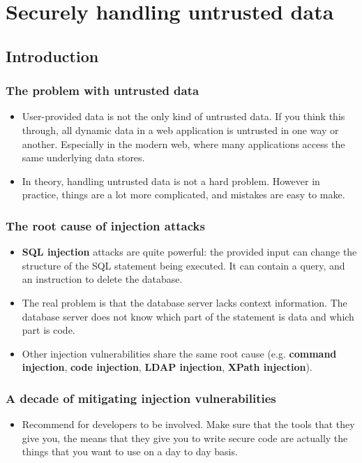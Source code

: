 \documentclass[../main.tex]{subfiles}
\begin{document}
\chapter{Securely handling untrusted data}

\section{Introduction}
\subsection{The problem with untrusted data}
\begin{itemize}
\item User-provided data is not the only kind of untrusted data. If you think this through, all dynamic data in a web application is untrusted in one way or another. Especially in the modern web, where many applications access the same underlying data stores.
\item In theory, handling untrusted data is not a hard problem. However in practice, things are a lot more complicated, and mistakes are easy to make.
\end{itemize}

\subsection{The root cause of injection attacks}
\begin{itemize}
\item \textbf{SQL injection} attacks are quite powerful: the provided input can change the structure of the SQL statement being executed. It can contain a query, and an instruction to delete the database.
\item The real problem is that the database server lacks context information. The database server does not know which part of the statement is data and which part is code.
\item Other injection vulnerabilities share the same root cause (e.g. \textbf{command injection}, \textbf{code injection}, \textbf{LDAP injection}, \textbf{XPath injection}).
\end{itemize}

\subsection{A decade of mitigating injection vulnerabilities}
\begin{itemize}
\item Recommend for developers to be involved. Make sure that the tools that they give you, the means that they give you to write secure code are actually the things that you want to use on a day to day basis. 
\end{itemize}
\end{document}
